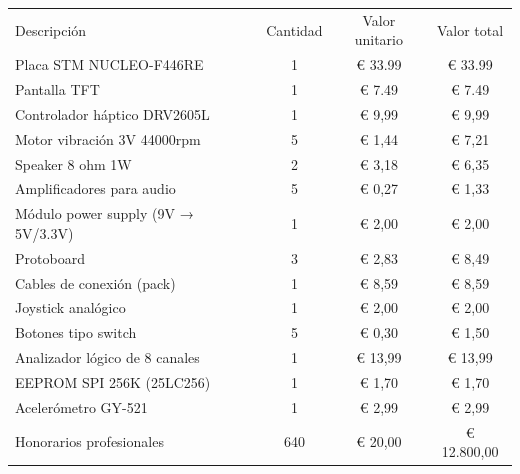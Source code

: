 \documentclass[
11pt, %
]{charter}
\begin{document}
\begin{table}[ht]
\centering
\begin{tabularx}{\linewidth}{@{}|X|c|r|r|@{}}
\hline
\rowcolor[HTML]{C0C0C0} 
\multicolumn{4}{|c|}{\cellcolor[HTML]{C0C0C0}COSTOS DIRECTOS} \\ \hline
\rowcolor[HTML]{C0C0C0} 
Descripción &
  \multicolumn{1}{c|}{\cellcolor[HTML]{C0C0C0}Cantidad} &
  \multicolumn{1}{c|}{\cellcolor[HTML]{C0C0C0}Valor unitario} &
  \multicolumn{1}{c|}{\cellcolor[HTML]{C0C0C0}Valor total} \\ \hline
Placa STM NUCLEO-F446RE &
  \multicolumn{1}{c|}{1} &
  \multicolumn{1}{c|}{€ 33.99} &
  \multicolumn{1}{c|}{€ 33.99} \\ \hline
Pantalla TFT &
  \multicolumn{1}{c|}{1} &
  \multicolumn{1}{c|}{€ 7.49} &
  \multicolumn{1}{c|}{€ 7.49} \\ \hline
Controlador háptico DRV2605L &
  \multicolumn{1}{c|}{1} &
  \multicolumn{1}{c|}{€ 9,99} &
  \multicolumn{1}{c|}{€ 9,99} \\ \hline
Motor vibración 3V 44000rpm &
  \multicolumn{1}{c|}{5} &
  \multicolumn{1}{c|}{€ 1,44} &
  \multicolumn{1}{c|}{€ 7,21} \\ \hline
Speaker 8 ohm 1W  &
  \multicolumn{1}{c|}{2} &
  \multicolumn{1}{c|}{€ 3,18} &
  \multicolumn{1}{c|}{€ 6,35} \\ \hline
Amplificadores para audio &
  \multicolumn{1}{c|}{5} &
  \multicolumn{1}{c|}{€ 0,27} &
  \multicolumn{1}{c|}{€ 1,33} \\ \hline
Módulo power supply (9V → 5V/3.3V) &
  \multicolumn{1}{c|}{1} &
  \multicolumn{1}{c|}{€ 2,00} &
  \multicolumn{1}{c|}{€ 2,00} \\ \hline
Protoboard &
  \multicolumn{1}{c|}{3} &
  \multicolumn{1}{c|}{€ 2,83} &
  \multicolumn{1}{c|}{€ 8,49} \\ \hline
Cables de conexión (pack) &
  \multicolumn{1}{c|}{1} &
  \multicolumn{1}{c|}{€ 8,59} &
  \multicolumn{1}{c|}{€ 8,59} \\ \hline
Joystick analógico &
  \multicolumn{1}{c|}{1} &
  \multicolumn{1}{c|}{€ 2,00} &
  \multicolumn{1}{c|}{€ 2,00} \\ \hline
Botones tipo switch &
  \multicolumn{1}{c|}{5} &
  \multicolumn{1}{c|}{€ 0,30} &
  \multicolumn{1}{c|}{€ 1,50} \\ \hline
Analizador lógico de 8 canales &
  \multicolumn{1}{c|}{1} &
  \multicolumn{1}{c|}{€ 13,99} &
  \multicolumn{1}{c|}{€ 13,99} \\ \hline
EEPROM SPI 256K (25LC256) &
  \multicolumn{1}{c|}{1} &
  \multicolumn{1}{c|}{€ 1,70} &
  \multicolumn{1}{c|}{€ 1,70} \\ \hline
Acelerómetro GY-521 &
  \multicolumn{1}{c|}{1} &
  \multicolumn{1}{c|}{€ 2,99} &
  \multicolumn{1}{c|}{€ 2,99} \\ \hline
Honorarios profesionales &
  \multicolumn{1}{c|}{640} &
  \multicolumn{1}{c|}{€ 20,00} &
  \multicolumn{1}{c|}{€ 12.800,00} \\ \hline


\end{tabularx}
\end{table}
\end{document}

